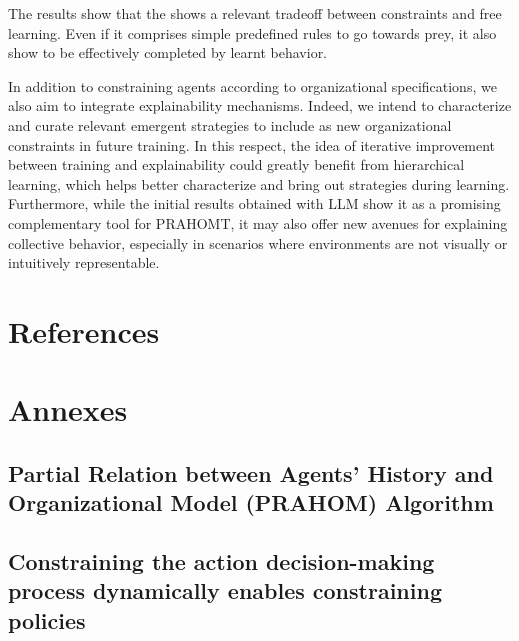 \documentclass[runningheads]{llncs}
\theoremstyle{freethm}
\theoremstyle{proofoutline}
\newcounter{proof}
\begin{document}
The results show that the  shows a relevant tradeoff between constraints and free learning. Even if it comprises simple predefined rules to go towards prey, it also show to be effectively completed by learnt behavior.

In addition to constraining agents according to organizational specifications, we also aim to integrate explainability mechanisms. Indeed, we intend to characterize and curate relevant emergent strategies to include as new organizational constraints in future training. In this respect, the idea of iterative improvement between training and explainability could greatly benefit from hierarchical learning, which helps better characterize and bring out strategies during learning. Furthermore, while the initial results obtained with LLM show it as a promising complementary tool for PRAHOMT, it may also offer new avenues for explaining collective behavior, especially in scenarios where environments are not visually or intuitively representable.


\section*{References}





\newpage

\section*{Annexes}\label{proof:jpc_to_ac}

\subsection*{Partial Relation between Agents' History and Organizational Model (PRAHOM) Algorithm}


\subsection*{Constraining the action decision-making process dynamically enables constraining policies}

\end{document}
